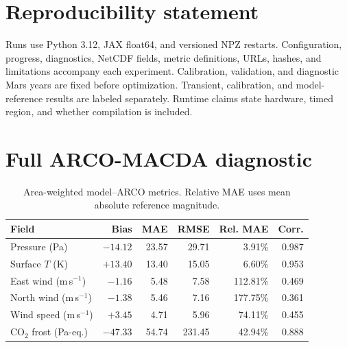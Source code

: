 \documentclass{article}
\begin{document}
\section*{Reproducibility statement}
Runs use Python 3.12, JAX float64, and versioned NPZ restarts. Configuration,
progress, diagnostics, NetCDF fields, metric definitions, URLs, hashes, and
limitations accompany each experiment. Calibration, validation, and diagnostic
Mars years are fixed before optimization. Transient, calibration, and
model-reference results are labeled separately. Runtime claims state hardware,
timed region, and whether compilation is included.



\appendix
\section{Full ARCO-MACDA diagnostic}\label{app:fullmetrics}
\begin{table}[h]\centering\small
\caption{Area-weighted model--ARCO metrics. Relative MAE uses mean absolute
reference magnitude.}
\begin{tabular}{lrrrrr}\toprule
Field & Bias & MAE & RMSE & Rel. MAE & Corr.\\\midrule
Pressure (Pa) & \(-14.12\)&23.57&29.71&3.91\%&0.987\\
Surface \(T\) (K) & \(+13.40\)&13.40&15.05&6.60\%&0.953\\
East wind (m\,s\(^{-1}\)) & \(-1.16\)&5.48&7.58&112.81\%&0.469\\
North wind (m\,s\(^{-1}\)) & \(-1.38\)&5.46&7.16&177.75\%&0.361\\
Wind speed (m\,s\(^{-1}\)) & \(+3.45\)&4.71&5.96&74.11\%&0.455\\
CO\(_2\) frost (Pa-eq.) & \(-47.33\)&54.74&231.45&42.94\%&0.888\\\bottomrule
\end{tabular}
\end{table}
\end{document}
